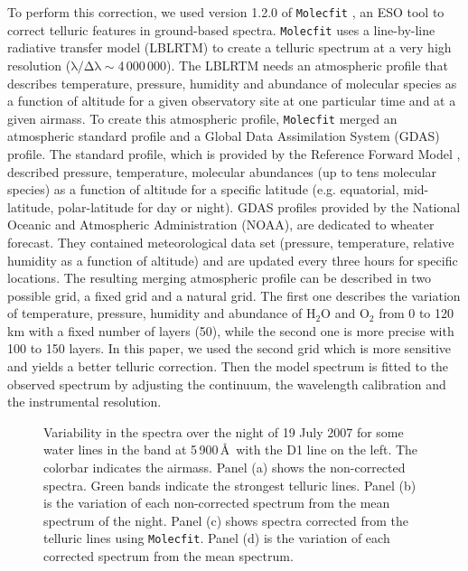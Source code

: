 \documentclass{aa}
\begin{document}
To perform this correction, we used version 1.2.0 of \texttt{Molecfit}  \citep{smette_molecfit_2015,kausch_molecfit_2015}, an ESO tool to correct telluric features in ground-based spectra. \texttt{Molecfit}  uses a line-by-line radiative transfer model (LBLRTM) to create a telluric spectrum at a very high resolution ($\mathrm{\lambda/\Delta\lambda} \sim$4\,000\,000). The LBLRTM needs an atmospheric profile that describes temperature, pressure, humidity and abundance of molecular species as a function of altitude for a given observatory site at one particular time and at a given airmass. To create this atmospheric profile, \texttt{Molecfit} merged an atmospheric standard profile and a Global Data Assimilation System (GDAS) profile.  The standard profile, which is provided by the Reference Forward Model \citep{remedios_investigation_2001}, described pressure, temperature, molecular abundances (up to tens molecular species) as a function of altitude for a specific latitude (e.g. equatorial, mid-latitude, polar-latitude for day or night). GDAS profiles provided by the National Oceanic and Atmospheric Administration (NOAA), are dedicated to wheater forecast. They contained meteorological data set (pressure, temperature, relative humidity as a function of altitude) and are updated every three hours for specific locations. The resulting merging atmospheric profile can be described in two possible grid, a fixed grid and a natural grid. The first one describes the variation of temperature, pressure, humidity and abundance of H$_{2}$O and O$_{2}$ from 0 to 120\,km with a fixed number of layers (50), while the second one is more precise with 100 to 150 layers. In this paper, we used the second grid which is more sensitive and yields a better telluric correction. Then the model spectrum is fitted to the observed spectrum by adjusting the continuum, the wavelength calibration and the instrumental resolution.

\begin{figure*}[t]
\caption[Résidu tellurique 5900 \AA]{Variability in the spectra over the night of 19 July 2007 for some water lines in the band at 5\,900\,\AA\ with the  D1 line on the left. The colorbar indicates the airmass. Panel (a) shows the non-corrected spectra. Green bands indicate the strongest telluric lines. Panel (b) is the variation of each non-corrected spectrum from the mean spectrum of the night. Panel (c) shows spectra corrected from the telluric lines using \texttt{Molecfit}. Panel (d) is the variation of each corrected spectrum from the mean spectrum.}
\label{résidu tellurique 5900}
\end{figure*}
\end{document}
